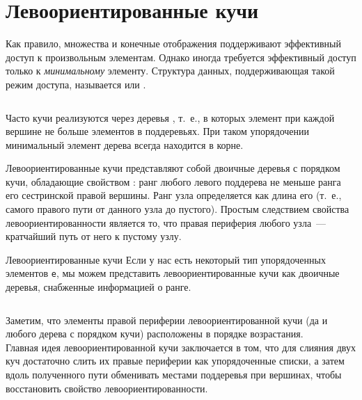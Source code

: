 \section{Левоориентированные кучи}

\begin{frame}[fragile]{}
Как правило, множества и конечные отображения поддерживают эффективный
доступ к произвольным элементам. Однако иногда требуется эффективный
доступ только к \emph{минимальному} элементу.  Структура данных,
поддерживающая такой режим доступа, называется  или .

\inputminted[firstline=4, lastline=12] {haskell}{code/Heap.hs}
\end{frame}

\begin{frame}[fragile]{}
Часто кучи реализуются через деревья , т.~е., в которых элемент при каждой вершине не
больше элементов в поддеревьях. При таком упорядочении минимальный
элемент дерева всегда находится в корне.\vspace{1cm}

Левоориентированные кучи \cite{Crane1972, Knuth1973a} представляют
собой двоичные деревья с порядком кучи, обладающие свойством
: ранг любого левого поддерева
не меньше ранга его сестринской правой вершины.  Ранг узла
определяется как длина его 
(т.~е., самого правого пути от данного узла до пустого).  Простым
следствием свойства левоориентированности является то, что правая
периферия любого узла~--- кратчайший путь от него к пустому узлу.
\end{frame}

\begin{frame}[fragile]{Левоориентированные кучи}
Если у нас есть некоторый тип упорядоченных элементов
\texttt{e}, 
мы можем представить левоориентированные кучи как
двоичные деревья, снабженные информацией о ранге.
\inputminted[firstline=18, lastline=18] {haskell}{code/Heap.hs}

Заметим, что элементы правой периферии левоориентированной кучи (да и
любого дерева с порядком кучи) расположены в порядке возрастания.\\

Главная идея левоориентированной кучи заключается в том, что для
слияния двух куч достаточно слить их правые периферии как
упорядоченные списки, а затем вдоль полученного пути обменивать
местами поддеревья при вершинах, чтобы восстановить свойство
левоориентированности. 

\end{frame}

